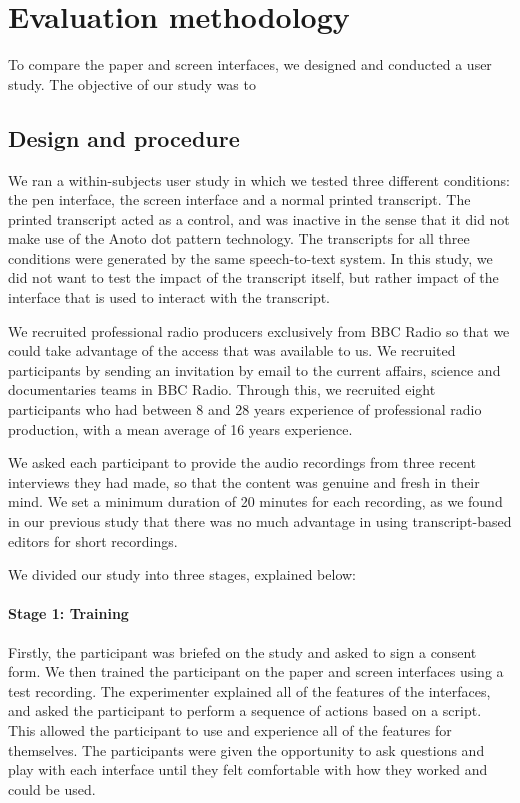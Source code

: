\section{Evaluation methodology}\label{sec:method}

To compare the paper and screen interfaces, we designed and conducted a user study.
The objective of our study was to 

\subsection{Design and procedure}
We ran a within-subjects user study in which we tested three different conditions: the pen interface, the screen
interface and a normal printed transcript. The printed transcript acted as a control, and was inactive in the sense
that it did not make use of the Anoto dot pattern technology.  The transcripts for all three conditions were generated
by the same speech-to-text system. In this study, we did not want to test the impact of the transcript itself, but
rather impact of the interface that is used to interact with the transcript.

We recruited professional radio producers exclusively from BBC Radio so that we could take advantage of the access that
was available to us. We recruited participants by sending an invitation by email to the current affairs, science and
documentaries teams in BBC Radio.  Through this, we recruited eight participants who had between 8 and 28 years
experience of professional radio production, with a mean average of 16 years experience.


We asked each participant to provide the audio recordings from three recent interviews they had made, so that the
content was genuine and fresh in their mind. We set a minimum duration of 20 minutes for each recording, as we found in
our previous study that there was no much advantage in using transcript-based editors for short recordings.

We divided our study into three stages, explained below:

\paragraph{Stage 1: Training}

Firstly, the participant was briefed on the study and asked to sign a consent form.  We then trained the
participant on the paper and screen interfaces using a test recording.  The experimenter explained all of the features
of the interfaces, and asked the participant to perform a sequence of actions based on a script. This allowed the
participant to use and experience all of the features for themselves. The participants were given the opportunity to
ask questions and play with each interface until they felt comfortable with how they worked and could be used.

